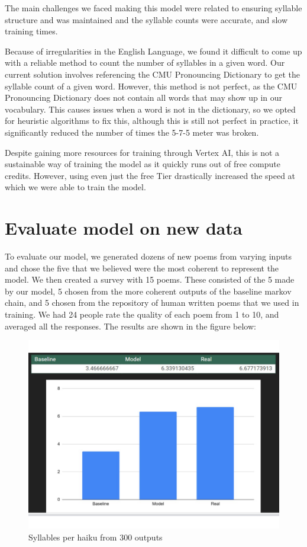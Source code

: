 \documentclass{article} %
\begin{document}
The main challenges we faced making this model were
related to ensuring syllable structure and was maintained and the syllable counts were accurate, and
slow training times.

Because of irregularities in the English Language, we found it difficult to
come up with a reliable method to count the number of syllables in a given word. Our current solution involves referencing
the CMU Pronouncing Dictionary \citep{cmu_pronouncing_dictionary} to get the syllable count of a given word.
However, this method is not perfect, as the CMU Pronouncing Dictionary does not contain all words that may show up in our vocabulary.
This causes issues when a word is not in the dictionary, so we opted for heuristic algorithms to fix this,
although this is still not perfect in practice, it significantly reduced the number of times the 5-7-5 meter was broken.

Despite gaining more resources for training through Vertex AI,
this is not a sustainable way of training the model as it quickly runs out of free compute credits.
However, using even just the free Tier drastically increased the speed at which we were able to train the model.

\section{Evaluate model on new data}
To evaluate our model, we generated dozens of new poems from varying inputs and chose the five that we believed were the most coherent to represent the model. We then created a survey with 15 poems. These consisted of the 5 made by our model, 5 chosen from the more coherent outputs of the baseline markov chain, and 5 chosen from the repository of human written poems that we used in training. We had 24 people rate the quality of each poem from 1 to 10, and averaged all the responses. The results are shown in the figure below:

\begin{figure}[h]
  \begin{center}
  \includegraphics[width=1\textwidth]{Figs/survey_results.png}
  \end{center}
  \caption{Syllables per haiku from 300 outputs}
  \label{fig:plot2}
\end{figure}
\end{document}

